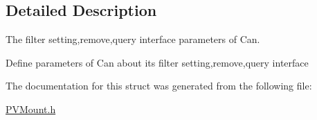 \subsection{Detailed Description}
The filter setting,remove,query interface parameters of Can. 

Define parameters of Can about its filter setting,remove,query interface 

The documentation for this struct was generated from the following file\+:\begin{DoxyCompactItemize}
\item 
\hyperlink{_p_v_mount_8h}{P\+V\+Mount.\+h}\end{DoxyCompactItemize}
